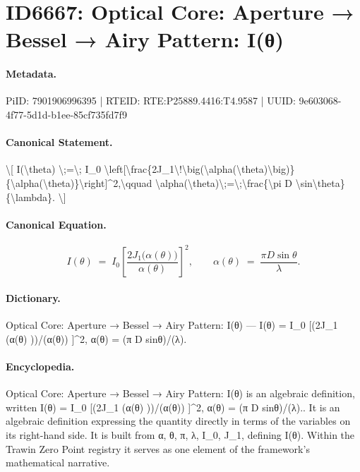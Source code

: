 \section*{ID6667: Optical Core: Aperture → Bessel → Airy Pattern: I(θ)}
\paragraph{Metadata.}
PiID: 7901906996395 | RTEID: RTE:P25889.4416:T4.9587 | UUID: 9e603068-4f77-5d1d-b1ee-85cf735fd7f9

\paragraph{Canonical Statement.}
\textbackslash{}[ I(\textbackslash{}theta) \textbackslash{};=\textbackslash{}; I\_0 \textbackslash{}left[\textbackslash{}frac\{2J\_1\textbackslash{}!\textbackslash{}big(\textbackslash{}alpha(\textbackslash{}theta)\textbackslash{}big)\}\{\textbackslash{}alpha(\textbackslash{}theta)\}\textbackslash{}right]\textasciicircum{}2,\textbackslash{}qquad \textbackslash{}alpha(\textbackslash{}theta)\textbackslash{};=\textbackslash{};\textbackslash{}frac\{\textbackslash{}pi D \textbackslash{}sin\textbackslash{}theta\}\{\textbackslash{}lambda\}. \textbackslash{}]

\paragraph{Canonical Equation.}
\[
I(\theta) \;=\; I_0 \left[\frac{2J_1\!\big(\alpha(\theta)\big)}{\alpha(\theta)}\right]^2,\qquad \alpha(\theta)\;=\;\frac{\pi D \sin\theta}{\lambda}.
\]

\paragraph{Dictionary.}
Optical Core: Aperture → Bessel → Airy Pattern: I(θ) — I(θ) = I\_0 [(2J\_1 (α(θ) ))/(α(θ)) ]\textasciicircum{}2, α(θ) = (π D sinθ)/(λ).

\paragraph{Encyclopedia.}
Optical Core: Aperture → Bessel → Airy Pattern: I(θ) is an algebraic definition, written I(θ) = I\_0 [(2J\_1 (α(θ) ))/(α(θ)) ]\textasciicircum{}2, α(θ) = (π D sinθ)/(λ).. It is an algebraic definition expressing the quantity directly in terms of the variables on its right-hand side. It is built from α, θ, π, λ, I\_0, J\_1, defining I(θ). Within the Trawin Zero Point registry it serves as one element of the framework's mathematical narrative.
